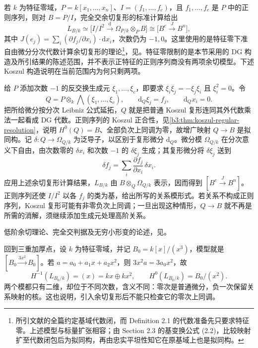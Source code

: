 \ProseParagraphBreak
若 \(k\) 为特征零域，\(P=k[x_1,\ldots,x_n]\)、\(I=(f_1,\ldots,f_c)\)，且 \(f_1,\ldots,f_c\) 是 \(P\) 中的正则序列，则对 \(B=P/I\)，完全交余切复形的标准计算给出
\[
	L_{B/k}\simeq\bigl[I/I^2\xrightarrow{\mathrm{d}}\Omega_{P/k}\otimes_PB\bigr] \cong\bigl[B^c\xrightarrow{J}B^n\bigr],
\]
其中 \(J(e_j)=\sum_i(\partial f_j/\partial x_i)\cdot\mathrm{d}x_i\)，次数仍为 \(-1,0\)。这里使用的是特征零下准自由微分分次代数计算余切复形的理论\footnote{所引文献的全篇约定基域代数闭，而 Definition 2.1 的代数准备先只要求特征零。上述模型与标量扩张相容；由 Section 2.3 的基变换公式 (2.2)，比较映射扩至代数闭包后为拟同构，再由忠实平坦性知它在原基域上也是拟同构。}，见\cite[Section 2.3, Proposition 2.12]{BravBussiJoyce2019Darboux}。特征零限制的是本节采用的 DG 构造及所引结果的陈述范围，并不表示正特征的正则序列商没有两项余切模型。下述 Koszul 构造说明在当前范围内为何只剩两项。

\begin{proofsketch}
	给 \(P\) 添加次数 \(-1\) 的反交换生成元 \(\xi_1,\ldots,\xi_c\)，即要求 \(\xi_i\xi_j=-\xi_j\xi_i\) 且 \(\xi_i^2=0\)。令
	\[
		Q=P\otimes_k\bigwedge(\xi_1,\ldots,\xi_c), \qquad \mathrm{d}_Q\xi_j=f_j,\qquad \mathrm{d}_Q x_i=0.
	\]
	把所给微分按分次 Leibniz 公式延拓，\(Q\) 就是把普通 Koszul 复形连同其外代数乘法一起看成 DG 代数。正则序列的 Koszul 正合性，见\cref{b3:thm:koszul-regular-resolution}，说明 \(H^0(Q)=B\)、全部负次上同调为零，故增广映射 \(Q\to B\) 是拟同构。记 \(\delta:Q\to\Omega_{Q/k}\) 为泛导子，以区别于复形微分 \(\mathrm{d}_Q\)。微分模 \(\Omega_{Q/k}\) 在分次意义下自由，由次数零的 \(\delta x_i\) 和次数 \(-1\) 的 \(\delta\xi_j\) 生成；其复形微分将 \(\delta\xi_j\) 送到
	\[
		\delta f_j=\sum_i\frac{\partial f_j}{\partial x_i}\,\delta x_i.
	\]
	应用上述余切复形计算结果，\(L_{B/k}\) 由 \(B\otimes_Q\Omega_{Q/k}\) 表示，因而得到 \([B^c\xrightarrow{J}B^n]\)。正则序列还使 \(I/I^2\) 以各 \(f_j\) 的类为基，给出所写的关系模形式。若关系不构成正则序列，Koszul 复形可能有非零负次上同调；一旦出现这种情形，\(Q\to B\) 就不再是所需的消解，须继续添加生成元处理高阶关系。
\end{proofsketch}

低阶余切理论、完全交判据及无穷小形变的论述，见\cite[Sections 2.1, 3.2, 4.3]{LichtenbaumSchlessinger1967CotangentComplex}。

\ProseParagraphBreak
回到三重加厚点，设 \(k\) 为特征零域，并记 \(B_0=k[x]/(x^3)\)，模型就是 \([B_0\xrightarrow{3x^2}B_0]\)。若 \(a=a_0+a_1x+a_2x^2\)，则 \(3x^2a=3a_0x^2\)，故
\[
	H^{-1}(L_{B_0/k})=(x)=kx\oplus kx^2, \qquad H^0(L_{B_0/k})=B_0/(x^2).
\]
两个模都只有二维，却位于不同次数，含义不同：零次是普通微分，负一次保留关系映射的核。这也说明，引入余切复形后不能只检查它的零次上同调。

